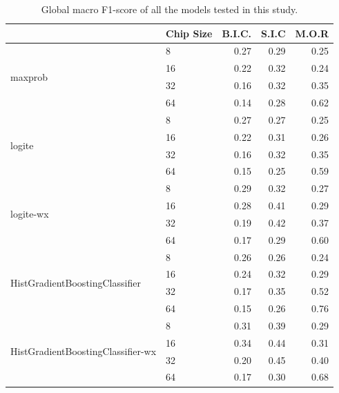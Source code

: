\begin{table}
    \centering
\begin{tabular}{llrrr}
    \toprule
     & Chip Size & B.I.C. & S.I.C & M.O.R \\
    \midrule
    \multirow[t]{4}{*}{maxprob} & 8 & 0.27 & 0.29 & 0.25 \\
    & 16 & 0.22 & 0.32 & 0.24 \\
    & 32 & 0.16 & 0.32 & 0.35 \\
    & 64 & 0.14 & 0.28 & 0.62 \\
   \cline{1-5}
   \multirow[t]{4}{*}{logite} & 8 & 0.27 & 0.27 & 0.25 \\
    & 16 & 0.22 & 0.31 & 0.26 \\
    & 32 & 0.16 & 0.32 & 0.35 \\
    & 64 & 0.15 & 0.25 & 0.59 \\
   \cline{1-5}
   \multirow[t]{4}{*}{logite-wx} & 8 & 0.29 & 0.32 & 0.27 \\
    & 16 & 0.28 & 0.41 & 0.29 \\
    & 32 & 0.19 & 0.42 & 0.37 \\
    & 64 & 0.17 & 0.29 & 0.60 \\
   \cline{1-5}
   \multirow[t]{4}{*}{HistGradientBoostingClassifier} & 8 & 0.26 & 0.26 & 0.24 \\
    & 16 & 0.24 & 0.32 & 0.29 \\
    & 32 & 0.17 & 0.35 & 0.52 \\
    & 64 & 0.15 & 0.26 & 0.76 \\
   \cline{1-5}
   \multirow[t]{4}{*}{HistGradientBoostingClassifier-wx} & 8 & 0.31 & 0.39 & 0.29 \\
    & 16 & 0.34 & 0.44 & 0.31 \\
    & 32 & 0.20 & 0.45 & 0.40 \\
    & 64 & 0.17 & 0.30 & 0.68 \\
    \bottomrule
\end{tabular}
\caption{\label{tab:global_avg_f1}\footnotesize Global macro F1-score of all the models
tested in this study.}
\end{table}

